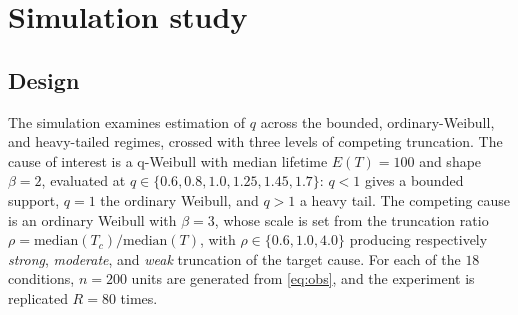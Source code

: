 \documentclass[ASNA,twocolumn]{USG}
\begin{document}
\begin{table}[h]
\centering
\caption{Divergence localisation and convergence diagnostics for the
production voltage NUTS fit ($2$ chains $\times\,2000$ draws, $1000$
warm-up, target acceptance $0.9$).}
\label{tab:divdiag}
\small
{}
\end{table}

\section{Simulation study}\label{sec:sim}

\subsection{Design}\label{sec:simdesign}
The simulation examines estimation of $q$ across the bounded,
ordinary-Weibull, and heavy-tailed regimes, crossed with three levels of
competing truncation. The cause of interest is a q-Weibull with median
lifetime $E(T)=100$ and shape $\beta=2$, evaluated at
$q\in\{0.6,0.8,1.0,1.25,1.45,1.7\}$: $q<1$ gives a bounded support, $q=1$
the ordinary Weibull, and $q>1$ a heavy tail. The competing cause is an
ordinary Weibull with $\beta=3$, whose scale is set from the truncation
ratio $\rho=\mathrm{median}(T_c)/\mathrm{median}(T)$, with
$\rho\in\{0.6,1.0,4.0\}$ producing respectively \emph{strong},
\emph{moderate}, and \emph{weak} truncation of the target cause. For each
of the $18$ conditions, $n=200$ units are generated from \eqref{eq:obs},
and the experiment is replicated $R=80$ times.
\end{document}
